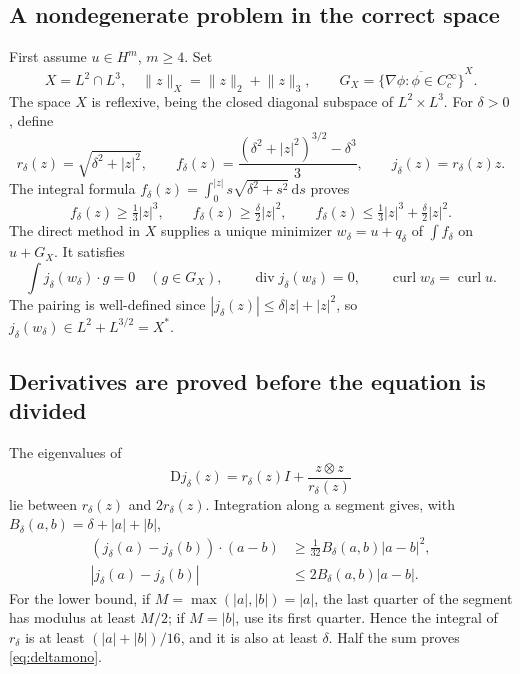 \documentclass[11pt,a4paper]{article}
\theoremstyle{definition}
\theoremstyle{remark}
\newcommand{\dd}{\,\mathrm d}
\newcommand{\norm}[1]{\lVert #1\rVert}
\newcommand{\diver}{\operatorname{div}}
\newcommand{\curl}{\operatorname{curl}}
\numberwithin{equation}{section}
\begin{document}
\subsection{A nondegenerate problem in the correct space}
First assume \(u\in H^m\), \(m\ge4\). Set
\[
X=L^2\cap L^3,\quad \norm z_X=\norm z_2+\norm z_3,
\qquad G_X=\overline{\{\nabla\phi:\phi\in C_c^\infty\}}^X.
\]
The space \(X\) is reflexive, being the closed diagonal subspace of \(L^2\times L^3\). For \(\delta>0\), define
\[
r_\delta(z)=\sqrt{\delta^2+|z|^2},\qquad
f_\delta(z)=\frac{(\delta^2+|z|^2)^{3/2}-\delta^3}{3},\qquad
j_\delta(z)=r_\delta(z)z.
\]
The integral formula \(f_\delta(z)=\int_0^{|z|}s\sqrt{\delta^2+s^2}\dd s\) proves
\begin{equation}\label{eq:fdelta}
f_\delta(z)\ge\tfrac13|z|^3,
\qquad f_\delta(z)\ge\tfrac\delta2|z|^2,
\qquad f_\delta(z)\le\tfrac13|z|^3+\tfrac\delta2|z|^2.
\end{equation}
The direct method in \(X\) supplies a unique minimizer \(w_\delta=u+q_\delta\) of \(\int f_\delta\) on \(u+G_X\). It satisfies
\begin{equation}\label{eq:deltastationary}
\int j_\delta(w_\delta)\cdot g=0\quad(g\in G_X),
\qquad \diver j_\delta(w_\delta)=0,
\qquad \curl w_\delta=\curl u.
\end{equation}
The pairing is well-defined since \(|j_\delta(z)|\le\delta|z|+|z|^2\), so \(j_\delta(w_\delta)\in L^2+L^{3/2}=X^*\).

\subsection{Derivatives are proved before the equation is divided}
The eigenvalues of
\[
\mathrm Dj_\delta(z)=r_\delta(z)I+\frac{z\otimes z}{r_\delta(z)}
\]
lie between \(r_\delta(z)\) and \(2r_\delta(z)\). Integration along a segment gives, with \(B_\delta(a,b)=\delta+|a|+|b|\),
\begin{align}
(j_\delta(a)-j_\delta(b))\cdot(a-b)&\ge\tfrac1{32}B_\delta(a,b)|a-b|^2,\label{eq:deltamono}\\
|j_\delta(a)-j_\delta(b)|&\le2B_\delta(a,b)|a-b|.\label{eq:deltalip}
\end{align}
For the lower bound, if \(M=\max(|a|,|b|)=|a|\), the last quarter of the segment has modulus at least \(M/2\); if \(M=|b|\), use its first quarter. Hence the integral of \(r_\delta\) is at least \((|a|+|b|)/16\), and it is also at least \(\delta\). Half the sum proves \eqref{eq:deltamono}.
\end{document}
